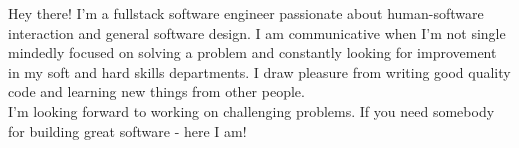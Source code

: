\documentclass[9pt]{developercv} %
\begin{document}
\vspace{0.5cm}



\begin{minipage}[t]{0.4\textwidth} %
	\vspace{-\baselineskip} %
	
	Hey there! I'm a fullstack software engineer passionate about human-software interaction 
	and general software design. I am communicative when I'm not single mindedly 
	focused on solving a problem and constantly looking for improvement 
	in my soft and hard skills departments. I draw pleasure
	from writing good quality code and learning new things from other people. \\
	I'm looking forward to working on challenging problems. If you need somebody
	for building great software - here I am!

\end{minipage}
\hfill %
\begin{minipage}[t]{0.5\textwidth} %
	\vspace{-\baselineskip} %
	\begin{barchart}{5.5}
	\end{barchart}
	
\end{minipage}

\begin{center}
\end{center}


\end{document}
